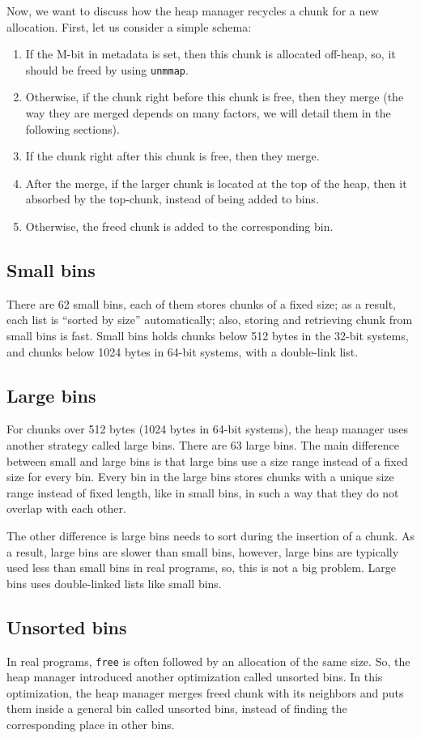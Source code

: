 \documentclass{masterthesis}
\newcommand*\ub{unsorted bins}
\newcommand*\lb{large bins}
\newcommand*\sbs{small bins}
\newcommand*\Ub{Unsorted bins\xspace}
\newcommand*\Lb{Large bins\xspace}
\newcommand*\Sbs{Small bins\xspace}
\begin{document}
Now, we want to discuss how the heap manager recycles a chunk for a new allocation. First, let us consider a simple schema:
\begin{enumerate}
	\item If the M-bit in metadata is set, then this chunk is allocated off-heap, so, it should be freed by using \lstinline{unmmap}.
	\item Otherwise, if the chunk right before this chunk is free, then they merge (the way they are merged depends on many factors, we will detail them in the following sections).
	\item If the chunk right after this chunk is free, then they merge.
	\item After the merge, if the larger chunk is located at the top of the heap, then it absorbed by the top-chunk, instead of being added to bins.
	\item Otherwise, the freed chunk is added to the corresponding bin.
\end{enumerate}

\subsection{\Sbs}
There are 62 \sbs{}, each of them stores chunks of a fixed size; as a result, each list is ``sorted by size'' automatically; also, storing and retrieving chunk from \sbs{} is fast. \Sbs{} holds chunks below 512 bytes in the 32-bit systems, and chunks below 1024 bytes in 64-bit systems, with a double-link list.

\subsection{\Lb}
For chunks over 512 bytes (1024 bytes in 64-bit systems), the heap manager uses another strategy called \lb{}. There are 63 \lb{}. The main difference between small and \lb{} is that \lb{} use a size range instead of a fixed size for every bin. Every bin in the \lb{} stores chunks with a unique size range instead of fixed length, like in \sbs{}, in such a way that they do not overlap with each other.

The other difference is \lb{} needs to sort during the insertion of a chunk. As a result, \lb{} are slower than \sbs{}, however, \lb{} are typically used less than \sbs{} in real programs, so, this is not a big problem. \Lb{} uses double-linked lists like \sbs{}.

\subsection{\Ub}
In real programs, \lstinline{free} is often followed by an allocation of the same size. So, the heap manager introduced another optimization called \ub{}. In this optimization, the heap manager merges freed chunk with its neighbors and puts them inside a general bin called \ub{}, instead of finding the corresponding place in other bins.
\end{document}
